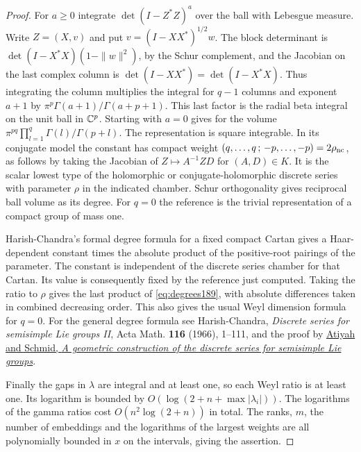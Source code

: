 \documentclass[a4paper,11pt]{article}
\theoremstyle{definition}
\theoremstyle{remark}
\numberwithin{equation}{section}
\begin{document}
\begin{proof}
For \(a\ge0\) integrate \(\det(I-Z^*Z)^a\) over the
ball with Lebesgue measure. Write \(Z=(X,v)\) and put
\(v=(I-XX^*)^{1/2}w\). The block determinant is
\(\det(I-X^*X)(1-\|w\|^2)\), by the Schur complement,
and the Jacobian on the last complex column is
\(\det(I-XX^*)=\det(I-X^*X)\). Thus integrating the
column multiplies the integral for \(q-1\) columns and
exponent \(a+1\) by
\(\pi^p\Gamma(a+1)/\Gamma(a+p+1)\). This last factor is
the radial beta integral on the unit ball in \(\mathbb C^p\).
Starting with \(a=0\) gives for the volume
\(\pi^{pq}\prod_{l=1}^q\Gamma(l)/\Gamma(p+l)\).
The representation is square integrable. In its conjugate
model the constant has compact weight
\((q,\ldots,q\,;\,-p,\ldots,-p)=2\rho_{\rm nc}\),
as follows by taking the Jacobian of \(Z\mapsto A^{-1}ZD\)
for \((A,D)\in K\). It is the scalar lowest type of the
holomorphic or conjugate-holomorphic discrete series with
parameter \(\rho\) in the indicated chamber. Schur
orthogonality gives reciprocal ball volume as its degree.
For \(q=0\) the reference is the trivial representation
of a compact group of mass one.

Harish-Chandra's formal degree formula for a fixed compact
Cartan gives a Haar-dependent constant times the absolute
product of the positive-root pairings of the parameter.
The constant is independent of the discrete series chamber
for that Cartan. Its value is consequently fixed by the
reference just computed. Taking the ratio to \(\rho\) gives
the last product of \eqref{eq:degrees189}, with absolute
differences taken in combined decreasing order. This also
gives the usual Weyl dimension formula for \(q=0\).
For the general degree formula see Harish-Chandra,
\emph{Discrete series for semisimple Lie groups II},
Acta Math. \textbf{116} (1966), 1--111, and the proof by
\href{https://www.math.utah.edu/~ptrapa/math-library/schmid/atiyah-schmid.pdf}{Atiyah
and Schmid, \emph{A geometric construction of the discrete
series for semisimple Lie groups}}.

Finally the gaps in \(\lambda\) are integral and at least one,
so each Weyl ratio is at least one. Its logarithm is bounded
by \(O(\log(2+n+\max|\lambda_i|))\). The logarithms of the
gamma ratios cost \(O(n^2\log(2+n))\) in total. The ranks,
\(m\), the number of embeddings and the logarithms of the
largest weights are all polynomially bounded in \(x\)
on the intervals, giving the assertion.
\end{proof}
\end{document}
